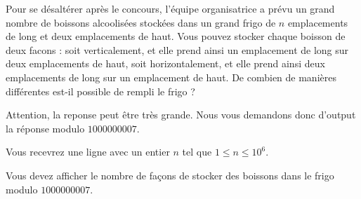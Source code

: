 \problemname{\problemyamlname}


Pour se désaltérer après le concours, l'équipe organisatrice a prévu un grand
nombre de boissons alcoolisées stockées dans un grand frigo de $n$ emplacements
de long et deux emplacements de haut. Vous pouvez stocker chaque boisson de
deux facons : soit verticalement, et elle prend ainsi un emplacement de long sur
deux emplacements de haut, soit horizontalement, et elle prend ainsi deux
emplacements de long sur un emplacement de haut. De combien de manières
différentes est-il possible de rempli le frigo ? 

Attention, la reponse peut être très grande. Nous vous demandons donc d'output
la réponse modulo $1000000007$.

\begin{Input}
	Vous recevrez une ligne avec un entier $n$ tel que $1 \le n \le 10^6$.
\end{Input}

\begin{Output}
	Vous devez afficher le nombre de façons de stocker des boissons dans le frigo modulo $1000000007$.
\end{Output}
